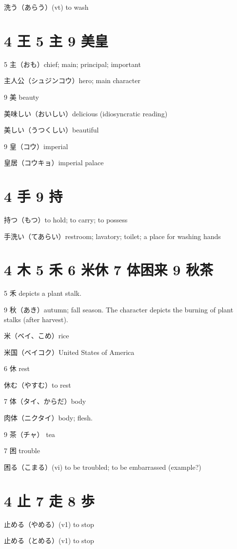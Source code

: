 洗う（あらう）(vt) to wash

\section{4 王 5 主 9 美皇}

5 主（おも）chief; main; principal; important

主人公（シュジンコウ）hero; main character

9 美 beauty

美味しい（おいしい）delicious (idiosyncratic reading)

美しい（うつくしい）beautiful

9 皇（コウ）imperial

皇居（コウキョ）imperial palace

\section{4 手 9 持}

持つ（もつ）to hold; to carry; to possess

手洗い（てあらい）restroom; lavatory; toilet; a place for washing hands

\section{4 木 5 禾 6 米休 7 体困来 9 秋茶}

5 禾 depicts a plant stalk.

9 秋（あき）autumn; fall season.
The character depicts the burning of plant stalks (after harvest).

米（ベイ、こめ）rice

米国（ベイコク）United States of America

6 休 rest

休む（やすむ）to rest

7 体（タイ、からだ）body

肉体（ニクタイ）body; flesh.

9 茶（チャ） tea

7 困 trouble

困る（こまる）(vi) to be troubled; to be embarrassed
(example?)

\section{4 止 7 走 8 歩}

止める（やめる）(v1) to stop

止める（とめる）(v1) to stop

